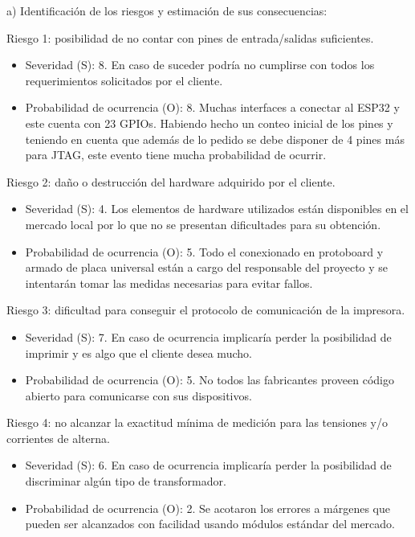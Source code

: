 \documentclass[11pt]{charter}
\begin{document}
a) Identificación de los riesgos y estimación de sus consecuencias:

Riesgo 1: posibilidad de no contar con pines de entrada/salidas suficientes.
\begin{itemize}
\item Severidad (S): 8. En caso de suceder podría no cumplirse con todos los requerimientos solicitados por el cliente.
\item Probabilidad de ocurrencia (O): 8. Muchas interfaces a conectar al ESP32 y este cuenta con 23 GPIOs. Habiendo hecho un conteo inicial de los pines y teniendo en cuenta que además de lo pedido se debe disponer de 4 pines más para JTAG, este evento tiene mucha probabilidad de ocurrir.
\end{itemize}  

Riesgo 2: daño o destrucción del hardware adquirido por el cliente.
\begin{itemize}
\item Severidad (S): 4. Los elementos de hardware utilizados están disponibles en el mercado local por lo que no se presentan dificultades para su obtención.
\item Probabilidad de ocurrencia (O): 5. Todo el conexionado en protoboard y armado de placa universal están a cargo del responsable del proyecto y se intentarán tomar las medidas necesarias para evitar fallos.
\end{itemize}

Riesgo 3: dificultad para conseguir el protocolo de comunicación de la impresora.
\begin{itemize}
\item Severidad (S): 7. En caso de ocurrencia implicaría perder la posibilidad de imprimir y es algo que el cliente desea mucho.
\item Probabilidad de ocurrencia (O): 5. No todos las fabricantes proveen código abierto para comunicarse con sus dispositivos.
\end{itemize}

Riesgo 4: no alcanzar la exactitud mínima de medición para las tensiones y/o corrientes de alterna.
\begin{itemize}
\item Severidad (S): 6. En caso de ocurrencia implicaría perder la posibilidad de discriminar algún tipo de transformador. 
\item Probabilidad de ocurrencia (O): 2. Se acotaron los errores a márgenes que pueden ser alcanzados con facilidad usando módulos estándar del mercado.
\end{itemize}
\end{document}
